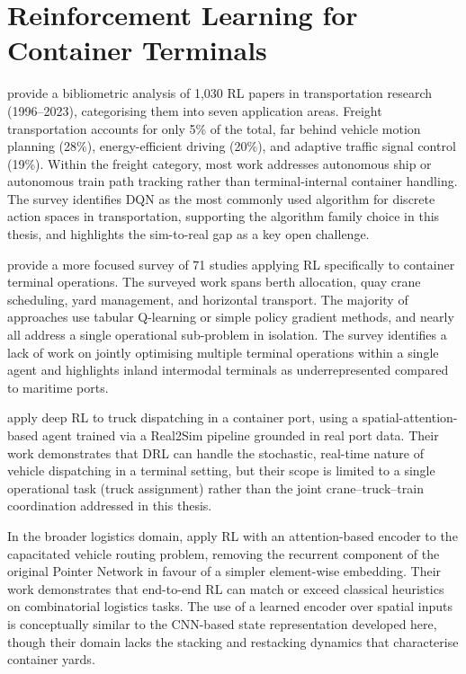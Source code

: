 \section{Reinforcement Learning for Container Terminals}
\label{sec:rw:rl}

\textcite{lai2024rl} provide a bibliometric analysis of 1{,}030 RL papers in transportation research (1996--2023), categorising them into seven application areas. Freight transportation accounts for only 5\% of the total, far behind vehicle motion planning (28\%), energy-efficient driving (20\%), and adaptive traffic signal control (19\%). Within the freight category, most work addresses autonomous ship or autonomous train path tracking rather than terminal-internal container handling. The survey identifies DQN as the most commonly used algorithm for discrete action spaces in transportation, supporting the algorithm family choice in this thesis, and highlights the sim-to-real gap as a key open challenge.

\textcite{colak2025rl} provide a more focused survey of 71 studies applying RL specifically to container terminal operations. The surveyed work spans berth allocation, quay crane scheduling, yard management, and horizontal transport. The majority of approaches use tabular Q-learning or simple policy gradient methods, and nearly all address a single operational sub-problem in isolation. The survey identifies a lack of work on jointly optimising multiple terminal operations within a single agent and highlights inland intermodal terminals as underrepresented compared to maritime ports.

\textcite{jin2024container} apply deep RL to truck dispatching in a container port, using a spatial-attention-based agent trained via a Real2Sim pipeline grounded in real port data. Their work demonstrates that DRL can handle the stochastic, real-time nature of vehicle dispatching in a terminal setting, but their scope is limited to a single operational task (truck assignment) rather than the joint crane--truck--train coordination addressed in this thesis.

In the broader logistics domain, \textcite{nazari2018vrp} apply RL with an attention-based encoder to the capacitated vehicle routing problem, removing the recurrent component of the original Pointer Network in favour of a simpler element-wise embedding. Their work demonstrates that end-to-end RL can match or exceed classical heuristics on combinatorial logistics tasks. The use of a learned encoder over spatial inputs is conceptually similar to the CNN-based state representation developed here, though their domain lacks the stacking and restacking dynamics that characterise container yards.

